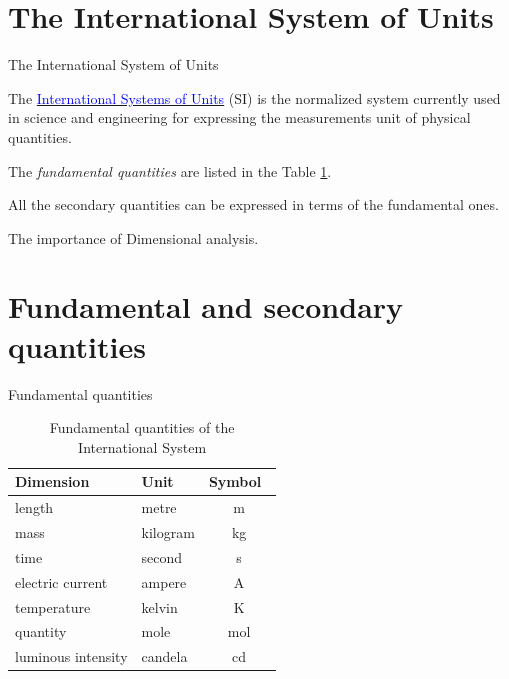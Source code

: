 \documentclass[10pt]{beamer}
\begin{document}
\section{The International System of Units}
\begin{frame}[fragile]{The International System of Units}


The  
\href{https://en.wikipedia.org/wiki/International_System_of_Units}{\textcolor{blue}{International Systems of Units}} (SI)
%
 is the normalized system currently used in science and engineering for expressing the measurements unit of physical quantities. 
 
 The  \alert{\emph{fundamental quantities}} are listed in the Table \ref{table:dimensions}.
 
  All the secondary quantities can be expressed in terms of the  fundamental ones.

The importance of Dimensional analysis.

\end{frame}

\section{Fundamental and secondary quantities}
\begin{frame}[fragile]{Fundamental quantities}

\begin{table}[ht]
\caption{Fundamental quantities of the International System} %
\centering %
\begin{tabular}{l l  c} %
\hline\hline %
Dimension & Unit\ & Symbol\  \\ [0.5ex] %
\hline %
length & metre &   \si{\metre} \\ %
mass         & kilogram &  \si{\kilogram}  \\
time        & second & \si{\second}  \\
electric current & ampere & \si{\ampere}  \\
temperature & kelvin & \si{\kelvin}  \\ [1ex] %
quantity & mole & \si{\mole}  \\ [1ex] %
luminous intensity & candela & \si{\candela}  \\ [1ex] %
\hline %
\end{tabular}
\label{table:dimensions} %
\end{table}
 


\end{frame}
\end{document}
